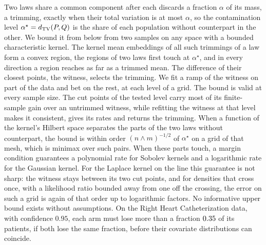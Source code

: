 Two laws share a common component after each discards a fraction $\alpha$ of its mass, a trimming, exactly when
their total variation is at most $\alpha$, so the contamination level $\alpha^\star=d_{\mathrm{TV}}(P,Q)$ is the share of each population
without counterpart in the other. We bound it from below from two samples on any space with a bounded
characteristic kernel. The kernel mean embeddings of all such trimmings of a law form a convex region, the regions of two laws first touch at $\alpha^\star$, and in every direction a region
reaches as far as a trimmed mean. The difference of their closest points, the witness, selects the trimming. We fit a ramp of the witness on part of the data and bet on the rest, at each level of a grid. The bound is
valid at every sample size. The cut points of the tested level carry most of its finite-sample gain over an untrimmed witness, while refitting
the witness at that level makes it consistent, gives its rates and returns the trimming. When a function of the
kernel's Hilbert space separates the parts of the two laws without counterpart, the bound is
within order $(n\wedge m)^{-1/2}$ of $\alpha^\star$ on a grid of that mesh, which is minimax over such pairs. When
these parts touch, a margin condition guarantees a polynomial rate for Sobolev kernels and a logarithmic rate for the
Gaussian kernel. For the Laplace kernel on the line this guarantee is not sharp: the witness stays between its two cut
points, and for densities that cross once, with a likelihood ratio bounded away from one off the crossing, the error
on such a grid is again of that order up to logarithmic factors. No informative upper bound exists without
assumptions. On the Right Heart Catheterization data, with confidence $0.95$, each arm must lose more than a fraction
$0.35$ of its patients, if both lose the same fraction, before their covariate distributions can coincide.
